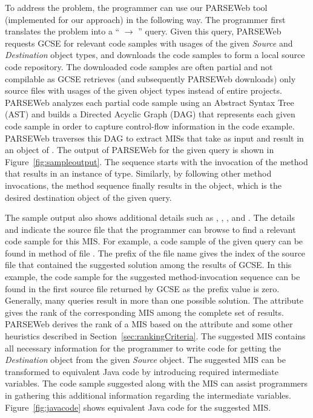 \documentclass{fp035-thummalapenta}
\begin{document}
To address the problem, the programmer can use our PARSEWeb tool
(implemented for our approach) in the following way. The
programmer first translates the problem into
a `` $\rightarrow$
'' query. Given this query, PARSEWeb
requests GCSE for relevant code samples with usages of the given
\emph{Source} and \emph{Destination} object types, and downloads the
code samples to form a local source code repository. The downloaded
code samples are often partial and not compilable as GCSE retrieves
(and subsequently PARSEWeb downloads) only source files with usages
of the given object types instead of entire projects. PARSEWeb
analyzes each partial code sample using an Abstract Syntax Tree
(AST) and builds a Directed Acyclic Graph (DAG) that represents each
given code sample in order to capture control-flow information in
the code example. PARSEWeb traverses this DAG to extract MISs that
take  as input and result
in an object of . The output of
PARSEWeb for the given query is shown in Figure~\ref{fig:sampleoutput}.
The sequence starts with the invocation of
the  method that results in
an instance of  type. Similarly, by following
other method invocations, the method sequence finally results in the
 object, which is the desired
destination object of the given query.

The sample output also shows additional details 
such as , , , and . 
The details  and
 indicate the source file that the programmer can
browse to find a relevant code sample for this MIS. For example, a
code sample of the given query can be found in method
 of file . The prefix of the
file name gives the index of the source file that contained the
suggested solution among the results of GCSE. In this example, the
code sample for the suggested method-invocation sequence can be
found in the first source file returned by GCSE as the prefix value
is zero. Generally, many queries result in more than one possible
solution. The  attribute gives the rank of the
corresponding MIS among the complete set of results. PARSEWeb
derives the rank of a MIS based on the 
attribute and some other heuristics described in
Section~\ref{sec:rankingCriteria}. The suggested MIS contains all
necessary information for the programmer to write code for getting
the \emph{Destination} object from the given \emph{Source} object.
The suggested MIS can be transformed to equivalent Java code by
introducing required intermediate variables. The code sample
suggested along with the MIS can assist programmers in gathering
this additional information regarding the intermediate variables.
Figure~\ref{fig:javacode} shows equivalent Java code for the
suggested MIS.
\end{document}
